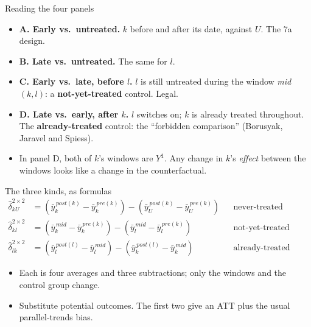 \documentclass[
  11pt,
  ignorenonframetext,
  aspectratio=169,
]{beamer}
\providecommand{\tightlist}{%
  \setlength{\itemsep}{0pt}\setlength{\parskip}{0pt}}
\begin{document}
\begin{frame}{Reading the four panels}
\protect{}\label{reading-the-four-panels}
\begin{itemize}
\tightlist
\item
  \textbf{A. Early vs.~untreated.} \(k\) before and after its date,
  against \(U\). The 7a design.
\item
  \textbf{B. Late vs.~untreated.} The same for \(l\).
\item
  \textbf{C. Early vs.~late, before \(l\).} \(l\) is still untreated
  during the window \emph{mid}\((k,l)\): a \textbf{not-yet-treated}
  control. Legal.
\item
  \textbf{D. Late vs.~early, after \(k\).} \(l\) switches on; \(k\) is
  already treated throughout. The \textbf{already-treated} control: the
  ``forbidden comparison'' (Borusyak, Jaravel and Spiess).
\end{itemize}

\vspace{0.4em}

\begin{itemize}
\tightlist
\item
  In panel D, both of \(k\)'s windows are \(Y^1\). Any change in \(k\)'s
  \emph{effect} between the windows looks like a change in the
  counterfactual.
\end{itemize}
\end{frame}

\begin{frame}{The three kinds, as formulas}
\protect{}\label{the-three-kinds-as-formulas}
\[
\begin{aligned}
\hat\delta^{2\times2}_{kU} &= (\bar y_k^{\,post(k)} - \bar y_k^{\,pre(k)}) - (\bar y_U^{\,post(k)} - \bar y_U^{\,pre(k)}) &&\text{never-treated control} \\[2pt]
\hat\delta^{2\times2}_{kl} &= (\bar y_k^{\,mid} - \bar y_k^{\,pre(k)}) - (\bar y_l^{\,mid} - \bar y_l^{\,pre(k)}) &&\text{not-yet-treated control} \\[2pt]
\hat\delta^{2\times2}_{lk} &= (\bar y_l^{\,post(l)} - \bar y_l^{\,mid}) - (\bar y_k^{\,post(l)} - \bar y_k^{\,mid}) &&\text{already-treated control}
\end{aligned}
\]

\begin{itemize}
\tightlist
\item
  Each is four averages and three subtractions; only the windows and the
  control group change.
\item
  Substitute potential outcomes. The first two give an ATT plus the
  usual parallel-trends bias.
\end{itemize}
\end{frame}
\end{document}
